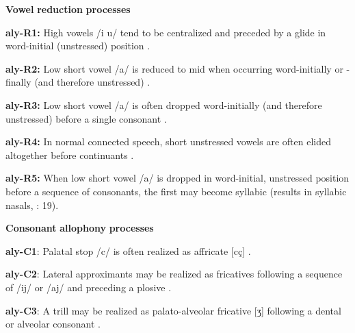 \begin{styleBody}
\textbf{Vowel} \textbf{reduction} \textbf{processes}
\end{styleBody}

\begin{styleBody}
\textbf{aly-R1:} High vowels /i u/ tend to be centralized and preceded by a glide in word-initial (unstressed) position \citep[25]{Yallop1977}.
\end{styleBody}

\begin{styleBody}
\textbf{aly-R2:} Low short vowel /a/ is reduced to mid when occurring word-initially or -finally (and therefore unstressed) \citep[25]{Yallop1977}.
\end{styleBody}

\begin{styleBody}
\textbf{aly-R3:} Low short vowel /a/ is often dropped word-initially (and therefore unstressed) before a single consonant \citep[28]{Yallop1977}.
\end{styleBody}

\begin{styleBody}
\textbf{aly-R4:} In normal connected speech, short unstressed vowels are often elided altogether before continuants \citep[27]{Yallop1977}.
\end{styleBody}

\begin{styleBody}
\textbf{aly-R5:} When low short vowel /a/ is dropped in word-initial, unstressed position before a sequence of consonants, the first may become syllabic (results in syllabic nasals, \citealt{Yallop1977}: 19).
\end{styleBody}

\begin{styleBody}
\textbf{Consonant} \textbf{allophony} \textbf{processes}
\end{styleBody}

\begin{styleBody}
\textbf{aly-C1}: Palatal stop /c/ is often realized as affricate [cç] \citep[21]{Yallop1977}.
\end{styleBody}

\begin{styleBody}
\textbf{aly-C2}: Lateral approximants may be realized as fricatives following a sequence of /ij/ or /aj/ and preceding a plosive \citep[19]{Yallop1977}.
\end{styleBody}

\begin{styleBody}
\textbf{aly-C3}: A trill may be realized as palato-alveolar fricative [ʒ] following a dental or alveolar consonant \citep[19]{Yallop1977}.
\end{styleBody}

